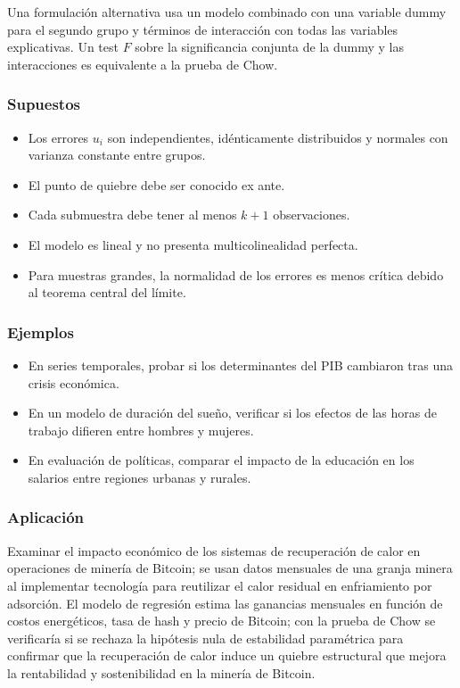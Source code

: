 \documentclass[12pt]{article}
\begin{document}
Una formulación alternativa usa un modelo combinado con una variable dummy para el segundo grupo y términos de interacción con todas las variables explicativas. Un test \( F \) sobre la significancia conjunta de la dummy y las interacciones es equivalente a la prueba de Chow.

\subsubsection*{Supuestos}
\begin{itemize}
    \item Los errores \( u_i \) son independientes, idénticamente distribuidos y normales con varianza constante entre grupos.
    \item El punto de quiebre debe ser conocido ex ante.
    \item Cada submuestra debe tener al menos \( k+1 \) observaciones.
    \item El modelo es lineal y no presenta multicolinealidad perfecta.
    \item Para muestras grandes, la normalidad de los errores es menos crítica debido al teorema central del límite.
\end{itemize}

\subsubsection*{Ejemplos}
\begin{itemize}
    \item En series temporales, probar si los determinantes del PIB cambiaron tras una crisis económica.
    \item En un modelo de duración del sueño, verificar si los efectos de las horas de trabajo difieren entre hombres y mujeres.
    \item En evaluación de políticas, comparar el impacto de la educación en los salarios entre regiones urbanas y rurales.
\end{itemize}

\subsubsection*{Aplicación}

Examinar el impacto económico de los sistemas de recuperación de calor en operaciones de minería de Bitcoin; se usan datos mensuales de una granja minera al implementar tecnología para reutilizar el calor residual en enfriamiento por adsorción. El modelo de regresión estima las ganancias mensuales en función de costos energéticos, tasa de hash y precio de Bitcoin; con la prueba de Chow se verificaría si se rechaza la hipótesis nula de estabilidad paramétrica para confirmar que la recuperación de calor induce un quiebre estructural que mejora la rentabilidad y sostenibilidad en la minería de Bitcoin.
\end{document}
